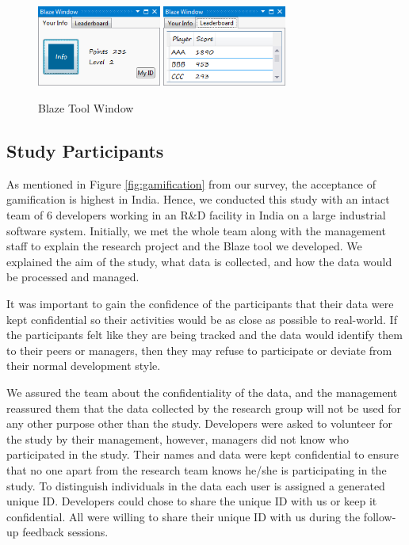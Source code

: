 \documentclass{sig-alternate}
\begin{document}
\begin{figure}
	\centering
	\includegraphics[width=1.6in]{blazeWindow.png}
\includegraphics[width=1.6in]{blazeLeaderboard.png}
	\caption{Blaze Tool Window}
	\label{fig:blazeWindow}
\end{figure}


\subsection{Study Participants}

As mentioned in Figure \ref{fig:gamification} from our survey, the acceptance of gamification is highest in India. Hence, we conducted this study with an intact team of 6 developers working in an R\&D facility in India on a large industrial software system. Initially, we met the whole team along with the management staff to explain the research project and the Blaze tool we developed. We  explained the aim of the study, what data is collected, and how the data would be processed and managed. 

It was important to gain the confidence of the participants that their data were kept confidential so their activities would be as close as possible to real-world. If the participants felt like they are being tracked and the data would identify them to their peers or managers, then they may refuse to participate or deviate from their normal development style.

We  assured the team about the confidentiality of the data, and the management reassured them that the data collected by the research group will not be used for any other purpose other than the study.  Developers were asked to volunteer for the study by their management, however, managers did not know who participated in the study. Their names and data were kept confidential to ensure that no one apart from the research team knows he/she is participating in the study.  To distinguish individuals in the data each user is assigned a generated unique ID.  Developers could chose to share the unique ID with us or keep it confidential.  All were willing to share their unique ID with us during the follow-up feedback sessions.   
\end{document}
